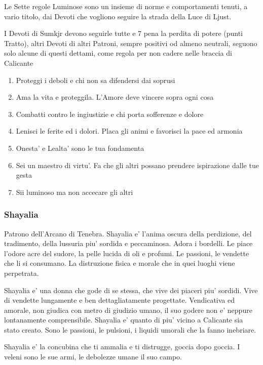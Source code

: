 \documentclass[a4paper,11pt,twoside,openany]{book}
\begin{document}
{\label{le-7-regole-luminose}

Le Sette regole Luminose sono un insieme di norme e comportamenti tenuti, a vario titolo, dai Devoti che vogliono seguire la strada della Luce di Ljust.

I Devoti di Sumkjr devono seguirle tutte e 7 pena la perdita di potere (punti Tratto), altri Devoti di altri Patroni, sempre positivi od almeno neutrali, seguono solo alcune di questi dettami, come regola per non cadere nelle braccia di Calicante


\begin{enumerate}
	\item Proteggi i deboli e chi non sa difendersi dai soprusi
	\item Ama la vita e proteggila. L'Amore deve vincere sopra ogni cosa
	\item Combatti contro le ingiustizie e chi porta sofferenze e dolore
	\item Lenisci le ferite ed i dolori. Placa gli animi e favorisci la pace
	ed armonia
	\item Onesta' e Lealta' sono le tua fondamenta
	\item Sei un maestro di virtu'. Fa che gli altri possano prendere ispirazione
	dalle tue gesta
	\item Sii luminoso ma non accecare gli altri
\end{enumerate}

\subsubsection{Shayalia}

\label{shayalia}

Patrono dell'Arcano di Tenebra. Shayalia e' l'anima oscura della perdizione, del tradimento, della lussuria piu' sordida e peccaminosa. Adora i bordelli. Le piace l'odore acre del sudore, la pelle lucida di oli e profumi. Le passioni, le vendette che li si consumano. La distruzione fisica e morale che in quei luoghi viene perpetrata.

Shayalia e' una donna che gode di se stessa, che vive dei piaceri piu' sordidi. Vive di vendette lungamente e ben dettagliatamente progettate. Vendicativa ed amorale, non giudica con metro di giudizio umano, il suo godere non e' neppure lontanamente comprensibile. Shayalia e' quanto di piu' vicino a Calicante sia stato creato. Sono le passioni, le pulsioni, i liquidi umorali che la fanno inebriare.

Shayalia e' la concubina che ti ammalia e ti distrugge, goccia dopo goccia. I veleni sono le sue armi, le debolezze umane il suo campo.

}
\end{document}
